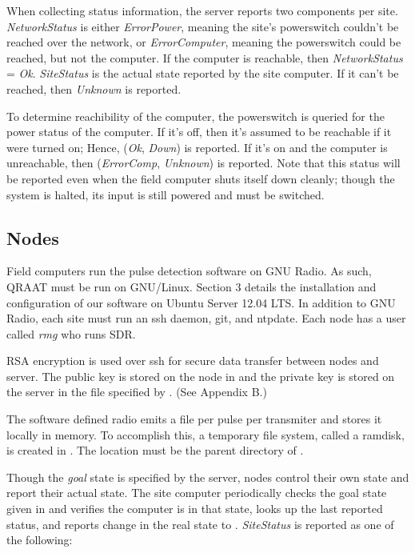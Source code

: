 \documentclass[letter]{article}
\begin{document}
When collecting status information, the server reports two components per site. \textit{NetworkStatus}
is either \textit{ErrorPower}, meaning the site's powerswitch couldn't be reached over the network, 
or \textit{ErrorComputer}, meaning the powerswitch could be reached, but not the computer. If the 
computer is reachable, then \textit{NetworkStatus} = \textit{Ok}. \textit{SiteStatus} is the actual 
state reported by the site computer. If it can't be reached, then \textit{Unknown} is reported. 

To determine reachibility of the computer, the powerswitch is queried for the power status of the 
computer. If it's off, then it's assumed to be reachable if it were turned on; Hence, (\textit{Ok}, \textit{Down})
is reported. If it's on and the computer is unreachable, then (\textit{ErrorComp}, \textit{Unknown}) is reported. 
Note that this status will be reported even when the field computer shuts itself down cleanly; though the system
is halted, its input is still powered and must be switched. 

\subsection{Nodes}
Field computers run the pulse detection software on GNU Radio. As such, QRAAT must be
run on GNU/Linux. Section 3 details the installation and configuration of our
software on Ubuntu Server 12.04 LTS. In addition to GNU Radio, each site must run 
an ssh daemon, git, and ntpdate. Each node has a user called \textit{rmg} who runs SDR. 

RSA encryption is used over ssh for secure data transfer between nodes and server. The 
public key is stored on the node in  and the private key
is stored on the server in the file specified by . (See Appendix B.)

The software defined radio emits a file per pulse per transmiter and stores it 
locally in memory. To accomplish this, a temporary file system, called a ramdisk, 
is created in . The location must be the parent directory 
of . 

Though the \textit{goal} state is specified by the server, nodes control their own state 
and report their actual state. The site computer periodically checks the goal state given in 
 and verifies the computer is in that state, looks up the last reported 
status, and reports change in the real state to . \textit{SiteStatus} is 
reported as one of the following: 
\end{document}
